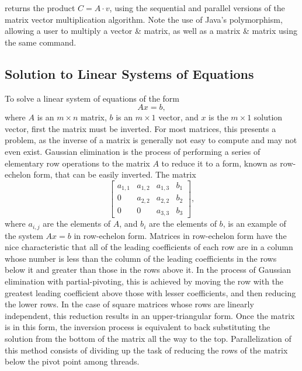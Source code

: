 \documentclass{dependencies/acm_proc_article-sp}
\begin{document}
returns the product $C=A\cdot v$, using the sequential and parallel versions of the
matrix vector multiplication algorithm. Note the use of Java's polymorphism,
allowing a user to multiply a vector \& matrix, as
well as a matrix \& matrix using the same command.

\subsection{Solution to Linear Systems of Equations}

To solve a linear system of equations of the form 
\begin{equation}
Ax=b, 
\end{equation}
where $A$ is an $m\times n$ matrix, $b$ is an $m\times 1$ vector, and $x$ is the $m\times 1$ solution vector, first the matrix must be inverted. For most matrices, this presents a problem, as the inverse of a matrix is generally not easy to compute and may not even exist. Gaussian elimination is the process of performing a series of elementary row operations to the matrix $A$ to reduce it to a form, known as row-echelon form, that can be easily inverted. The matrix 
\begin{equation} 
\left[ \begin{array}{ccc|c}
a_{1,1} & a_{1,2} & a_{1,3} & b_1 \\
0 & a_{2,2} & a_{2,2} & b_2 \\
0 & 0 & a_{3,3} & b_3
\end{array} \right],
\end{equation}
where $a_{i,j}$ are the elements of $A$, and $b_i$ are the elements of $b$, is an example of the system $Ax=b$ in row-echelon form. Matrices in row-echelon form have the nice characteristic that all of the leading coefficients of each row are in a column whose number is less than the column of the leading coefficients in the rows below it and greater than those in the rows above it. In the process of Gaussian elimination with partial-pivoting, this is achieved by moving the row with the greatest leading coefficient above those with lesser coefficients, and then reducing the lower rows. In the case of square matrices whose rows are linearly independent, this reduction results in an upper-triangular form. Once the matrix is in this form, the inversion process is equivalent to back substituting the solution from the bottom of the matrix all the way to the top. Parallelization of this method consists of dividing up the task of reducing the rows of the matrix below the pivot point among threads.
\end{document}
